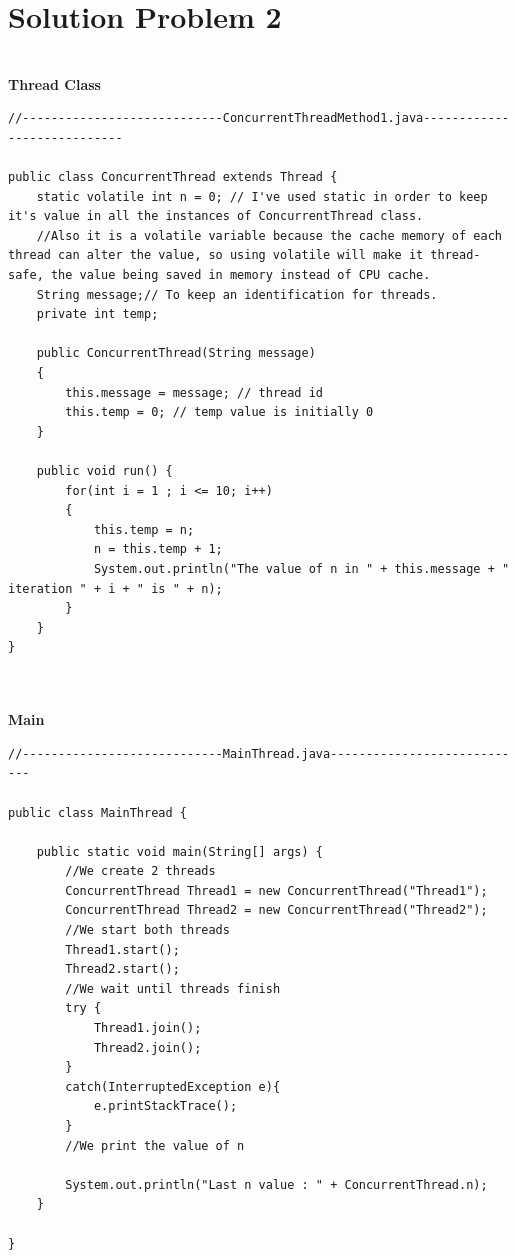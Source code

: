 \documentclass[14pt]{article}
\begin{document}
\section*{Solution Problem 2}\\
\textbf{Thread Class}\\
\begin{lstlisting}
//----------------------------ConcurrentThreadMethod1.java----------------------------

public class ConcurrentThread extends Thread {
	static volatile int n = 0; // I've used static in order to keep it's value in all the instances of ConcurrentThread class. 
	//Also it is a volatile variable because the cache memory of each thread can alter the value, so using volatile will make it thread-safe, the value being saved in memory instead of CPU cache.
	String message;// To keep an identification for threads.
	private int temp;
	
	public ConcurrentThread(String message)
	{
		this.message = message; // thread id
		this.temp = 0; // temp value is initially 0
	}
	
	public void run() {
		for(int i = 1 ; i <= 10; i++)
		{
			this.temp = n;
			n = this.temp + 1;
			System.out.println("The value of n in " + this.message + " iteration " + i + " is " + n);
		}
	}
}


\end{lstlisting}

\vspace{5 mm}\\
\textbf{Main}\\
\begin{lstlisting}
//----------------------------MainThread.java----------------------------

public class MainThread {

	public static void main(String[] args) {
		//We create 2 threads
		ConcurrentThread Thread1 = new ConcurrentThread("Thread1");    
        ConcurrentThread Thread2 = new ConcurrentThread("Thread2");
        //We start both threads
        Thread1.start();
        Thread2.start();
        //We wait until threads finish
        try {
        	Thread1.join();
        	Thread2.join();
        }
        catch(InterruptedException e){
        	e.printStackTrace();
        }
        //We print the value of n
        
        System.out.println("Last n value : " + ConcurrentThread.n);
	}

}


\end{lstlisting}
\end{document}

